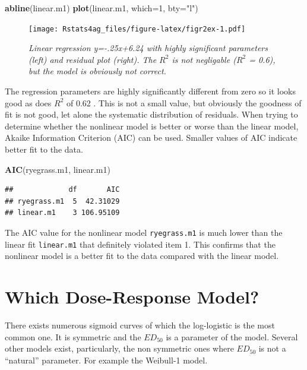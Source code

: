 \documentclass[letterpaper,]{book}
\newenvironment{Shaded}{\begin{snugshade}}{\end{snugshade}}
\newcommand{\DataTypeTok}[1]{\textcolor[rgb]{0.13,0.29,0.53}{#1}}
\newcommand{\DecValTok}[1]{\textcolor[rgb]{0.00,0.00,0.81}{#1}}
\newcommand{\KeywordTok}[1]{\textcolor[rgb]{0.13,0.29,0.53}{\textbf{#1}}}
\newcommand{\NormalTok}[1]{#1}
\newcommand{\StringTok}[1]{\textcolor[rgb]{0.31,0.60,0.02}{#1}}
\begin{document}
\begin{Shaded}
\begin{Highlighting}[]
\KeywordTok{abline}\NormalTok{(linear.m1)}
\KeywordTok{plot}\NormalTok{(linear.m1, }\DataTypeTok{which=}\DecValTok{1}\NormalTok{, }\DataTypeTok{bty=}\StringTok{"l"}\NormalTok{)}
\end{Highlighting}
\end{Shaded}

\begin{figure}
\centering
\texttt{[image: Rstats4ag\_files/figure-latex/figr2ex-1.pdf]}
\caption{\label{fig:figr2ex}\emph{Linear regression y=-.25x+6.24 with highly significant parameters (left) and residual plot (right). The \(R^2\) is not negligable (\(R^2\) = 0.6), but the model is obviously not correct.}}
\end{figure}

The regression parameters are highly significantly different from zero so it looks good as does \(R^2\) of 0.62 . This is not a small value, but obviously the goodness of fit is not good, let alone the systematic distribution of residuals. When trying to determine whether the nonlinear model is better or worse than the linear model, Akaike Information Criterion (AIC) can be used. Smaller values of AIC indicate better fit to the data.

\begin{Shaded}
\begin{Highlighting}[]
\KeywordTok{AIC}\NormalTok{(ryegrass.m1, linear.m1)}
\end{Highlighting}
\end{Shaded}

\begin{verbatim}
##             df       AIC
## ryegrass.m1  5  42.31029
## linear.m1    3 106.95109
\end{verbatim}

The AIC value for the nonlinear model \texttt{ryegrass.m1} is much lower than the linear fit \texttt{linear.m1} that definitely violated item 1. This confirms that the nonlinear model is a better fit to the data compared with the linear model.

\hypertarget{which-dose-response-model}{%
\section{Which Dose-Response Model?}\label{which-dose-response-model}}

There exists numerous sigmoid curves of which the log-logistic is the most common one. It is symmetric and the \(ED_{50}\) is a parameter of the model. Several other models exist, particularly, the non symmetric ones where \(ED_{50}\) is not a ``natural'' parameter. For example the Weibull-1 model.
\end{document}
